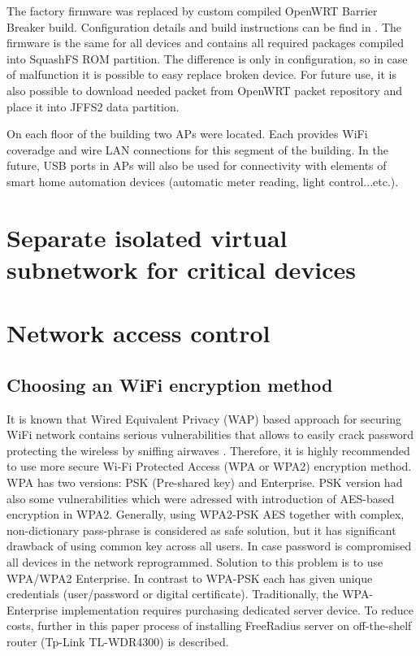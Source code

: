 \documentclass{llncs}
\begin{document}
The factory firmware was replaced by custom compiled OpenWRT Barrier Breaker build. Configuration details and build instructions can be find in \cite{GitHub}. The firmware is the same for all devices and contains all required packages compiled into SquashFS ROM partition. The difference is only in configuration, so in case of malfunction it is possible to easy replace broken device. For future use, it is also possible to download needed packet from OpenWRT packet repository and place it into JFFS2 data partition.

On each floor of the building two APs were located. Each provides WiFi coveradge and wire LAN connections for this segment of the building. In the future, USB ports in APs will also be used for connectivity with elements of smart home automation devices (automatic meter reading, light control...etc.). 

\section{Separate isolated virtual subnetwork for critical devices}

\section{Network access control}

\subsection{Choosing an WiFi encryption method}
It is known that Wired Equivalent Privacy (WAP) based approach for
securing WiFi network contains serious vulnerabilities that allows to
easily crack password protecting the wireless by sniffing airwaves
\cite{WebDeadAgain}.
Therefore, it is highly recommended to use more secure Wi-Fi Protected Access
(WPA or WPA2) encryption method. WPA has two versions: PSK
(Pre-shared key) and Enterprise. PSK version had also some
vulnerabilities \cite{WpaPskVulnerabilities} which were adressed with
introduction of AES-based encryption in WPA2. Generally, using WPA2-PSK AES
together with complex, non-dictionary pass-phrase is considered as safe solution, but it has
significant drawback of using common key across all users.
In case password is compromised all devices in the
network reprogrammed. Solution to this problem is to use WPA/WPA2 Enterprise. In
contrast to WPA-PSK each has given unique credentials (user/password or digital
certificate). Traditionally, the WPA-Enterprise implementation requires
purchasing dedicated server device. To reduce costs, further in this paper
process of installing FreeRadius server on off-the-shelf router (Tp-Link
TL-WDR4300) is described.
\end{document}
